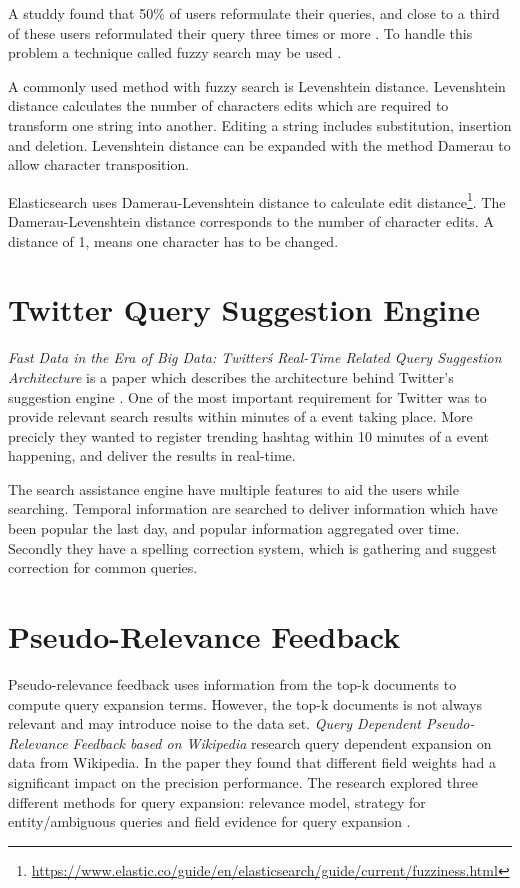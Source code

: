 A studdy found that 50\% of users reformulate their queries, and close to a third of these users reformulated their query three times or more \cite{query-reformulate}.
To handle this problem a technique called fuzzy search may be used \cite{fuzzy-search}.

A commonly used method with fuzzy search is Levenshtein distance.
Levenshtein distance calculates the number of characters edits which are required to transform one string into another.
Editing a string includes substitution, insertion and deletion.
Levenshtein distance can be expanded with the method Damerau to allow character transposition.

Elasticsearch uses Damerau-Levenshtein distance to calculate edit distance\footnote{\url{https://www.elastic.co/guide/en/elasticsearch/guide/current/fuzziness.html}}.
The Damerau-Levenshtein distance corresponds to the number of character edits.
A distance of 1, means one character has to be changed.

\section{Twitter Query Suggestion Engine}
\textit{Fast Data in the Era of Big Data: Twitter\'s Real-Time Related Query Suggestion Architecture} is a paper which describes the architecture behind Twitter's suggestion engine \cite{twitter-suggestion}.
One of the most important requirement for Twitter was to provide relevant search results within minutes of a event taking place.
More precicly they wanted to register trending hashtag within 10 minutes of a event happening, and deliver the results in real-time.

The search assistance engine have multiple features to aid the users while searching.
Temporal information are searched to deliver information which have been popular the last day, and popular information aggregated over time.
Secondly they have a spelling correction system, which is gathering and suggest correction for common queries.

\section{Pseudo-Relevance Feedback}
Pseudo-relevance feedback uses information from the top-k documents to compute query expansion terms.
However, the top-k documents is not always relevant and may introduce noise to the data set.
\textit{Query Dependent Pseudo-Relevance Feedback based on Wikipedia} research query dependent expansion on data from Wikipedia.
In the paper they found that different field weights had a significant impact on the precision performance.
The research explored three different methods for query expansion:
relevance model, strategy for entity/ambiguous queries and field evidence for query expansion \cite{pseudo-relevance-wikipedia}.
